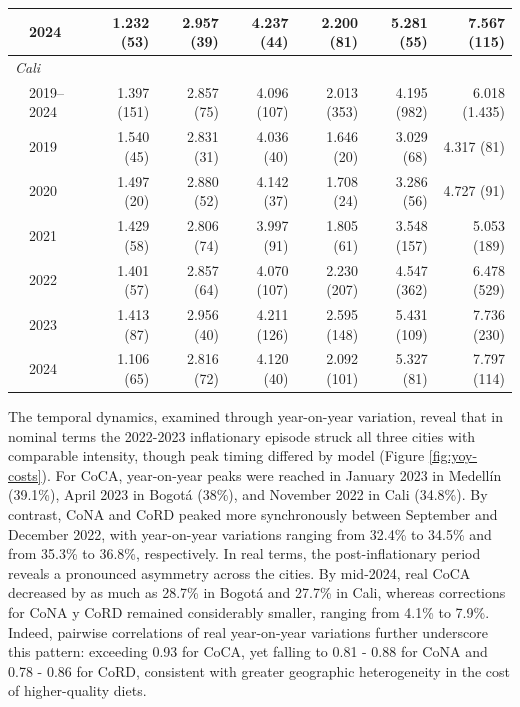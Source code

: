 \documentclass[Afour, sageh,times]{sagej}
\begin{document}
\begin{table}[htbp]
\begin{tabular}{llrrrrrr}
 & 2024      & 1.232 (53)  & 2.957 (39) & 4.237 (44)  & 2.200 (81)  & 5.281 (55)  & 7.567 (115)  \\
\midrule
\multicolumn{8}{l}{\textit{Cali}} \\
 & 2019–2024 & 1.397 (151) & 2.857 (75) & 4.096 (107) & 2.013 (353) & 4.195 (982) & 6.018 (1.435) \\
 & 2019      & 1.540 (45)  & 2.831 (31) & 4.036 (40)  & 1.646 (20)  & 3.029 (68)  & 4.317 (81)   \\
 & 2020      & 1.497 (20)  & 2.880 (52) & 4.142 (37)  & 1.708 (24)  & 3.286 (56)  & 4.727 (91)   \\
 & 2021      & 1.429 (58)  & 2.806 (74) & 3.997 (91)  & 1.805 (61)  & 3.548 (157) & 5.053 (189)  \\
 & 2022      & 1.401 (57)  & 2.857 (64) & 4.070 (107) & 2.230 (207) & 4.547 (362) & 6.478 (529)  \\
 & 2023      & 1.413 (87)  & 2.956 (40) & 4.211 (126) & 2.595 (148) & 5.431 (109) & 7.736 (230)  \\
 & 2024      & 1.106 (65)  & 2.816 (72) & 4.120 (40)  & 2.092 (101) & 5.327 (81)  & 7.797 (114)  \\
\bottomrule
\end{tabular}

\vspace{0.5em}

\endgroup
\end{table}

The temporal dynamics, examined through year-on-year variation, reveal that in nominal terms the 2022-2023 inflationary episode struck all three cities with comparable intensity, though peak timing differed by model (Figure \ref{fig:yoy-costs}). For CoCA, year-on-year peaks were reached in January 2023 in Medellín (39.1\%), April 2023 in Bogotá (38\%), and November 2022 in Cali (34.8\%). By contrast, CoNA and CoRD peaked more synchronously between September and December 2022, with year-on-year variations ranging from 32.4\% to 34.5\% and from 35.3\% to 36.8\%, respectively. In real terms, the post-inflationary period reveals a pronounced asymmetry across the cities. By mid-2024, real CoCA decreased by as much as 28.7\% in Bogotá and 27.7\% in Cali, whereas corrections for CoNA y CoRD remained considerably smaller, ranging from 4.1\% to 7.9\%. Indeed, pairwise correlations of real year-on-year variations further underscore this pattern: exceeding 0.93 for CoCA, yet falling to 0.81 - 0.88 for CoNA and 0.78 - 0.86 for CoRD, consistent with greater geographic heterogeneity in the cost of higher-quality diets.
\end{document}

